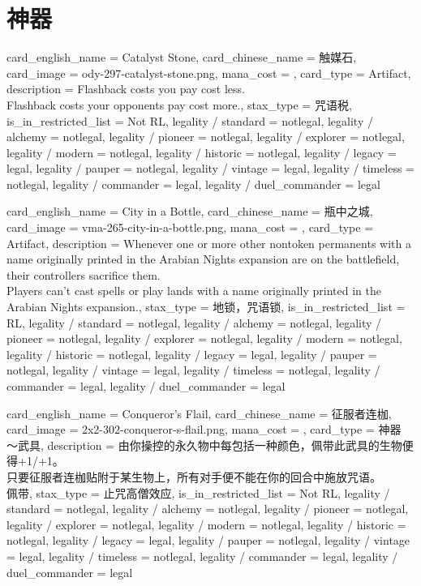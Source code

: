\documentclass[lang = cn, color = black, 10pt]{AllThatStax}
\begin{document}
\section{神器}

\card
{
	card_english_name = {Catalyst Stone},
	card_chinese_name = {触媒石},
	card_image = ody-297-catalyst-stone.png,
	mana_cost = ,
	card_type = Artifact,
	description = {Flashback costs you pay cost  less.\\
		Flashback costs your opponents pay cost  more.},
	stax_type = 咒语税,
	is_in_restricted_list = Not RL,
	legality / standard = notlegal,
	legality / alchemy = notlegal,
	legality / pioneer = notlegal,
	legality / explorer = notlegal,
	legality / modern = notlegal,
	legality / historic = notlegal,
	legality / legacy = legal,
	legality / pauper = notlegal,
	legality / vintage = legal,
	legality / timeless = notlegal,
	legality / commander = legal,
	legality / duel_commander = legal
}

\card
{
	card_english_name = {City in a Bottle},
	card_chinese_name = {瓶中之城},
	card_image = vma-265-city-in-a-bottle.png,
	mana_cost = ,
	card_type = Artifact,
	description = {Whenever one or more other nontoken permanents with a name originally printed in the Arabian Nights expansion are on the battlefield, their controllers sacrifice them.\\
		Players can't cast spells or play lands with a name originally printed in the Arabian Nights expansion.},
	stax_type = 地锁，咒语锁,
	is_in_restricted_list = RL,
	legality / standard = notlegal,
	legality / alchemy = notlegal,
	legality / pioneer = notlegal,
	legality / explorer = notlegal,
	legality / modern = notlegal,
	legality / historic = notlegal,
	legality / legacy = legal,
	legality / pauper = notlegal,
	legality / vintage = legal,
	legality / timeless = notlegal,
	legality / commander = legal,
	legality / duel_commander = legal
}

\card
{
	card_english_name = {Conqueror's Flail},
	card_chinese_name = {征服者连枷},
	card_image = 2x2-302-conqueror-s-flail.png,
	mana_cost = ,
	card_type = 神器 ～武具,
	description = {由你操控的永久物中每包括一种颜色，佩带此武具的生物便得+1/+1。\\
		只要征服者连枷贴附于某生物上，所有对手便不能在你的回合中施放咒语。\\
		佩带},
	stax_type = 止咒高僧效应,
	is_in_restricted_list = Not RL,
	legality / standard = notlegal,
	legality / alchemy = notlegal,
	legality / pioneer = notlegal,
	legality / explorer = notlegal,
	legality / modern = notlegal,
	legality / historic = notlegal,
	legality / legacy = legal,
	legality / pauper = notlegal,
	legality / vintage = legal,
	legality / timeless = notlegal,
	legality / commander = legal,
	legality / duel_commander = legal
}
\end{document}

